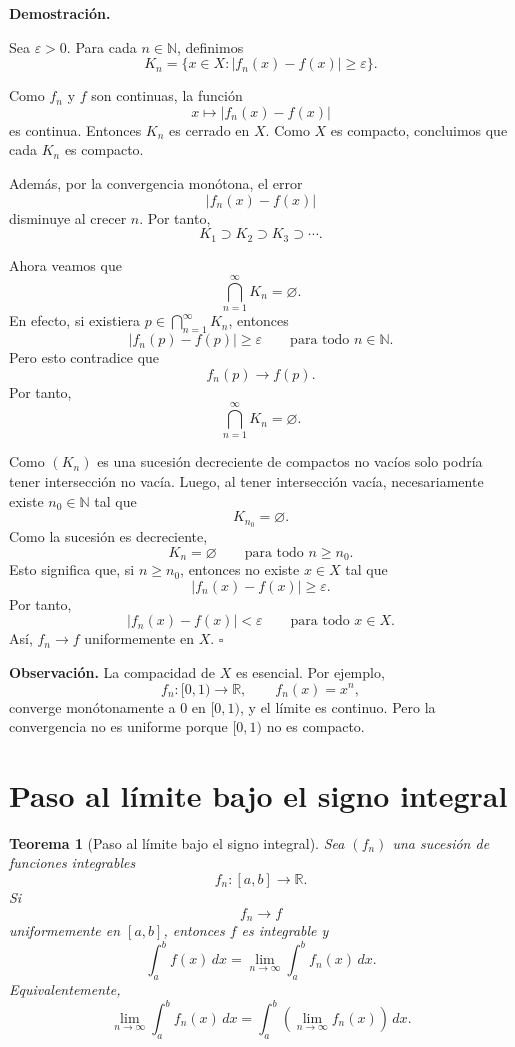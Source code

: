 \documentclass[11pt,a4paper,openany]{book}
\theoremstyle{definition}
\theoremstyle{plain}
\newtheorem{teorema}{Teorema}[chapter]
\theoremstyle{remark}
\renewenvironment{proof}[1][\textbf{Demostración.}]{%
  \par\noindent #1\ \normalfont
}{\hfill$\square$\par\medskip}
\newenvironment{observacion}
{\par\medskip\noindent\textbf{Observación. }\normalfont}
{\par\medskip}
\newcommand{\R}{\mathbb{R}}
\newcommand{\N}{\mathbb{N}}
\begin{document}
\begin{proof}
Sea $\varepsilon>0$. Para cada $n\in\N$, definimos
\[
    K_n
    =
    \{x\in X: |f_n(x)-f(x)|\geq \varepsilon\}.
\]

Como $f_n$ y $f$ son continuas, la función
\[
    x\mapsto |f_n(x)-f(x)|
\]
es continua. Entonces $K_n$ es cerrado en $X$. Como $X$ es compacto, concluimos
que cada $K_n$ es compacto.

Además, por la convergencia monótona, el error
\[
    |f_n(x)-f(x)|
\]
disminuye al crecer $n$. Por tanto,
\[
    K_1\supset K_2\supset K_3\supset \cdots.
\]

Ahora veamos que
\[
    \bigcap_{n=1}^{\infty}K_n=\varnothing.
\]
En efecto, si existiera $p\in\bigcap_{n=1}^{\infty}K_n$, entonces
\[
    |f_n(p)-f(p)|\geq \varepsilon
    \qquad \text{para todo }n\in\N.
\]
Pero esto contradice que
\[
    f_n(p)\to f(p).
\]
Por tanto,
\[
    \bigcap_{n=1}^{\infty}K_n=\varnothing.
\]

Como $(K_n)$ es una sucesión decreciente de compactos no vacíos solo podría
tener intersección no vacía. Luego, al tener intersección vacía, necesariamente
existe $n_0\in\N$ tal que
\[
    K_{n_0}=\varnothing.
\]
Como la sucesión es decreciente,
\[
    K_n=\varnothing
    \qquad \text{para todo }n\geq n_0.
\]
Esto significa que, si $n\geq n_0$, entonces no existe $x\in X$ tal que
\[
    |f_n(x)-f(x)|\geq \varepsilon.
\]
Por tanto,
\[
    |f_n(x)-f(x)|<\varepsilon
    \qquad \text{para todo }x\in X.
\]
Así, $f_n\to f$ uniformemente en $X$.
\end{proof}

\begin{observacion}
La compacidad de $X$ es esencial. Por ejemplo,
\[
    f_n:[0,1)\to\R,\qquad f_n(x)=x^n,
\]
converge monótonamente a $0$ en $[0,1)$, y el límite es continuo. Pero la
convergencia no es uniforme porque $[0,1)$ no es compacto.
\end{observacion}

\section{Paso al límite bajo el signo integral}

\begin{grisplano}
\begin{teorema}[Paso al límite bajo el signo integral]
Sea $(f_n)$ una sucesión de funciones integrables
\[
    f_n:[a,b]\to\R.
\]
Si
\[
    f_n\to f
\]
uniformemente en $[a,b]$, entonces $f$ es integrable y
\[
    \int_a^b f(x)\,dx
    =
    \lim_{n\to\infty}\int_a^b f_n(x)\,dx.
\]
Equivalentemente,
\[
    \lim_{n\to\infty}\int_a^b f_n(x)\,dx
    =
    \int_a^b\left(\lim_{n\to\infty}f_n(x)\right)\,dx.
\]
\end{teorema}
\end{grisplano}
\end{document}
